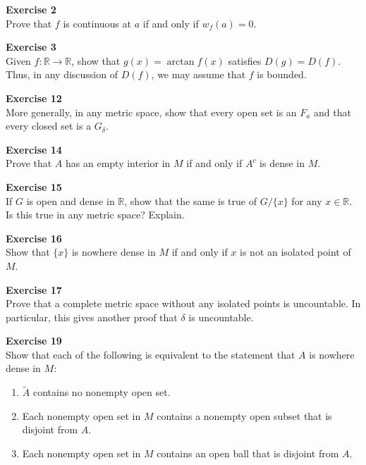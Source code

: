 \documentclass[12pt, a4paper]{article}
\theoremstyle{plain}
\newcommand{\R}{\mathbb{R}}
\newenvironment{exercise}[2][Exercise]
    { \begin{mdframed}[backgroundcolor=gray!20] \textbf{#1 #2} \\}
    {  \end{mdframed}}
\begin{document}
\begin{exercise}{2}
Prove that $f$ is continuous at $a$ if and only if $w_f(a)=0$.
\end{exercise}

\begin{exercise}{3}
Given $f:\R\rightarrow \R$, show that $g(x)=\arctan f(x)$ satisfies $D(g)=D(f)$. Thus, in any discussion of $D(f)$, we may assume that $f$ is bounded.
\end{exercise}

\begin{exercise}{12}
More generally, in any metric space, show that every open set is an $F_a$ and that every closed set is a $G_\delta$.
\end{exercise}

\begin{exercise}{14}
Prove that $A$ has an empty interior in $M$ if and only if $A^c$ is dense in $M$.
\end{exercise}

\begin{exercise}{15}
If $G$ is open and dense in $\R$, show that the same is true of $G/\{x\}$ for any $x\in \R$. Is this true in any metric space? Explain.
\end{exercise}

\begin{exercise}{16}
Show that $\{x\}$ is nowhere dense in $M$ if and only if $x$ is not an isolated point of $M$.
\end{exercise}

\begin{exercise}{17}
Prove that a complete metric space without any isolated points is uncountable. In particular, this gives another proof that $\delta$ is uncountable.
\end{exercise}

\begin{exercise}{19}
Show that each of the following is equivalent to the statement that $A$ is nowhere dense in $M$:
\begin{enumerate}[label=(\alph*)]
\item $\tilde{A}$ contains no nonempty open set.
\item Each nonempty open set in $M$ contains a nonempty open subset that is disjoint from $A$.
\item Each nonempty open set in $M$ contains an open ball that is disjoint from $A$.
\end{enumerate}
\end{exercise}
\end{document}

